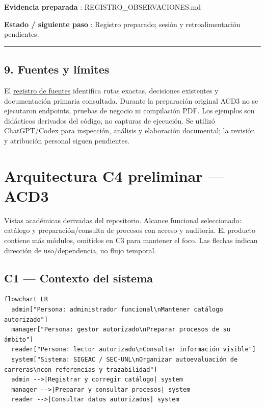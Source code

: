 \documentclass[12pt,a4paper]{report}
\begin{document}
\textbf{Evidencia preparada }: REGISTRO\_OBSERVACIONES.md

\textbf{Estado / siguiente paso }: Registro preparado; sesión y
retroalimentación pendientes.

\medskip\hrule\medskip


\section{9. Fuentes y límites}\label{informe-9-fuentes-y-luxedmites}

El \href{FUENTES.md}{registro de fuentes} identifica rutas exactas,
decisiones existentes y documentación primaria consultada. Durante la
preparación original ACD3 no se ejecutaron endpoints, pruebas de negocio
ni compilación PDF. Los
ejemplos son didácticos derivados del código, no capturas de ejecución.
Se utilizó ChatGPT/Codex para inspección, análisis y elaboración
documental; la revisión y atribución personal siguen pendientes.

\nocite{c4context,c4container,c4component,rfc9110,rfc5789,rfc6585,rfc9457,fetch,proyecto}
\chapter{Arquitectura C4 preliminar ---
ACD3}\label{c4-arquitectura-c4-preliminar--acd3}

Vistas académicas derivadas del repositorio. Alcance funcional
seleccionado: catálogo y preparación/consulta de procesos con acceso y
auditoría. El producto contiene más módulos, omitidos en C3 para
mantener el foco. Las flechas indican dirección de uso/dependencia, no
flujo temporal.

\section{C1 --- Contexto del sistema}\label{c4-c1--contexto-del-sistema}

\begin{Verbatim}[breaklines=true,breakanywhere=true,fontsize=\small]
flowchart LR
  admin["Persona: administrador funcional\nMantener catálogo autorizado"]
  manager["Persona: gestor autorizado\nPreparar procesos de su ámbito"]
  reader["Persona: lector autorizado\nConsultar información visible"]
  system["Sistema: SIGEAC / SEC-UNL\nOrganizar autoevaluación de carreras\ncon referencias y trazabilidad"]
  admin -->|Registrar y corregir catálogo| system
  manager -->|Preparar y consultar procesos| system
  reader -->|Consultar datos autorizados| system
\end{Verbatim}
\end{document}
